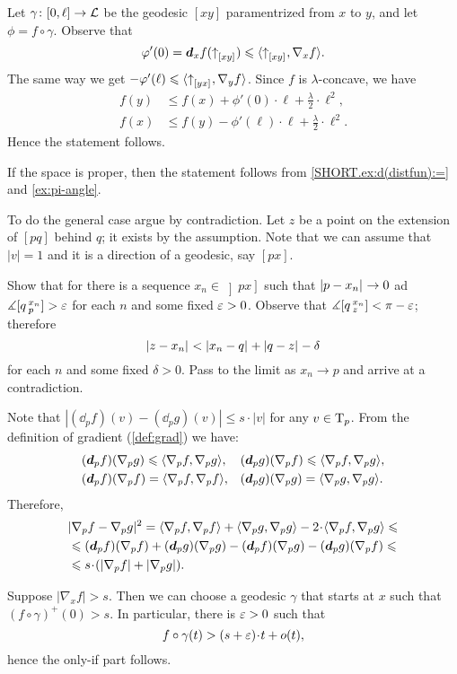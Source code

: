 Let $\gamma\colon[0,\ell]\to \mathcal{L}$ be the geodesic $[xy]$ paramentrized from $x$ to $y$,
and let $\phi=f\circ\gamma$.
Observe that 
\[\varphi'(0)=\bm{d}_xf({\uparrow}_{[{x}{y}]_{{}}})\leqslant \langle{\uparrow}_{[{x}{y}]_{{}}},\nabla_{x}f\rangle.\]
The same way we get $-\varphi'(\ell)\leqslant \langle{\uparrow}_{[{y}{x}]_{{}}},\nabla_{y}f\rangle$.
Since $f$ is $\lambda$-concave, we have
\begin{align*}
f(y)&\le f(x)+\phi'(0)\cdot \ell+\tfrac\lambda2\cdot\ell^2,
\\
f(x)&\le f(y)-\phi'(\ell)\cdot \ell+\tfrac\lambda2\cdot\ell^2.
\end{align*}
Hence the statement follows.

If the space is proper, then the statement follows from \ref{SHORT.ex:d(distfun):=} and \ref{ex:pi-angle}.

To do the general case argue by contradiction.
Let $z$ be a point on the extension of $[pq]$ behind $q$;
it exists by the assumption.
Note that we can assume that $|v|=1$ and it is a direction of a geodesic, say $[px]$.

Show that for there is a sequence $x_n\in \left]px\right]$ such that $\dist{p}{x_n}{}\to0$ ad
$\measuredangle [q\,{}^{x_n}_{p}]>\varepsilon$ for each $n$ and some fixed $\varepsilon>0$.
Observe that $\mangle\hinge q{x_n}z\z<\pi-\eps$; therefore
\[\dist{z}{x_n}{}<\dist{x_n}{q}{}+\dist{q}z{}-\delta\]
for each $n$ and some fixed $\delta>0$.
Pass to the limit as $x_n\to p$ and arrive at a contradiction.

Note that
$|(\dd_p f)(v)-(\dd_p g)(v)|\le s\cdot|v|$
for any $v\in \mathrm{T}_p$.
From the definition of gradient (\ref{def:grad}) we have:
\begin{align*}
&(\bm{d}_p f)(\nabla_p g)\leqslant\langle\nabla_p f,\nabla_p g\rangle,
&&(\bm{d}_p g)(\nabla_p f)\leqslant\langle\nabla_p f,\nabla_p g\rangle,
\\
&(\bm{d}_p f)(\nabla_p f)=\langle\nabla_p f,\nabla_p f\rangle,
&&(\bm{d}_p g)(\nabla_p g)=\langle\nabla_p g,\nabla_p g\rangle.
\end{align*}
Therefore,
\begin{align*}
&\dist[2]{\nabla_pf}{\nabla_pg}{}
=\<\nabla_p f,\nabla_p f\>+\<\nabla_p g,\nabla_p g\>-2\cdot\<\nabla_p f,\nabla_p g\>
\le
\\
&\le (\dd_p f)(\nabla_p f)+(\dd_p g)(\nabla_p g)-
(\dd_p f)(\nabla_p g)-(\dd_p g)(\nabla_p f)
\le
\\
&\le s\cdot(|\nabla_p f|+|\nabla_p g|).
\end{align*}

Suppose $|\nabla_xf|> s$.
Then we can choose a geodesic $\gamma$ that starts at $x$ such that 
$(f\circ\gamma)^+(0)>s$.
In particular, there is $\varepsilon>0$ such that
\[f\circ\gamma(t)>(s+\eps)\cdot t+o(t),\]
hence the only-if part follows.

